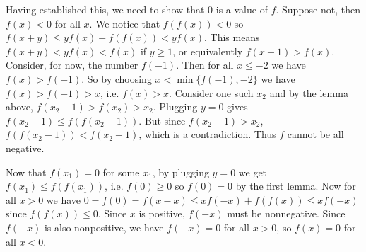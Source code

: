 \documentclass[11pt,a4paper]{article}
\begin{document}
\begin{enumerate}
	Having established this, we need to show that 0 is a value of $f$. Suppose not, then $f(x)<0$ for all $x$. 
	We notice that $f(f(x))< 0$ so $f(x+y)\le yf(x)+f(f(x))< yf(x)$. 
	This means $f(x+y)<yf(x)<f(x)$ if $y\ge 1$, or equivalently $f(x-1)>f(x)$. Consider, for now, the number $f(-1)$. Then for all $x\le -2$ we have $f(x)>f(-1)$. So by choosing $x<\min\{f(-1), -2\}$ we have $f(x)>f(-1)>x$, i.e. $f(x)>x$. 
	Consider one such $x_2$ and by the lemma above, $f(x_2-1)>f(x_2)>x_2$. 
	Plugging $y=0$ gives $f(x_2-1)\le f(f(x_2-1))$. But since $f(x_2-1)>x_2$, $f(f(x_2-1))<f(x_2-1)$, which is a contradiction. Thus $f$ cannot be all negative. 
	
	Now that $f(x_1)=0$ for some $x_1$, by plugging $y=0$ we get $f(x_1)\le f(f(x_1))$, i.e. $f(0)\ge 0$ so $f(0)=0$ by the first lemma. Now for all $x>0$ we have $0=f(0)=f(x-x)\le xf(-x)+f(f(x))\le xf(-x)$ since $f(f(x))\le 0$. Since $x$ is positive, $f(-x)$ must be nonnegative. Since $f(-x)$ is also nonpositive, we have $f(-x)=0$ for all $x>0$, so $f(x)=0$ for all $x<0$. 
	
\end{enumerate}
\end{document}

